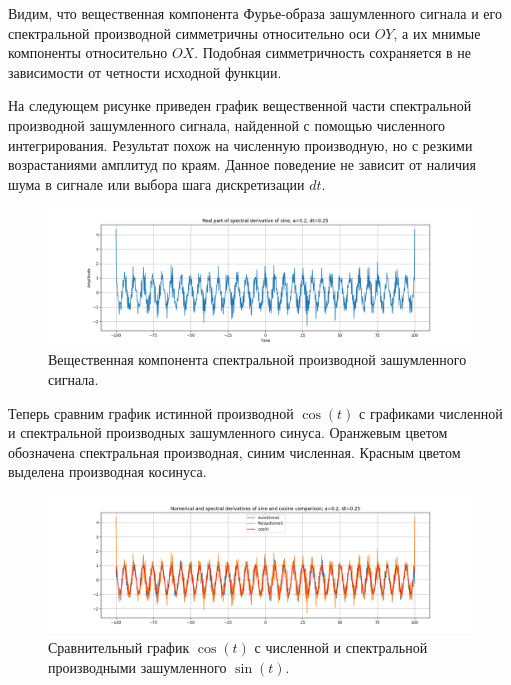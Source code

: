 \documentclass[a4paper, 12pt]{article}
\begin{document}
    Видим, что вещественная компонента Фурье-образа зашумленного сигнала и его спектральной производной симметричны относительно оси
    $OY$, а их мнимые компоненты относительно $OX$. Подобная симметричность сохраняется в не зависимости от четности исходной функции.


    На следующем рисунке приведен график вещественной части спектральной производной зашумленного сигнала, найденной с помощью численного интегрирования.
    Результат похож на численную производную, но с резкими возрастаниями амплитуд по краям. Данное поведение не зависит от наличия шума в сигнале или
    выбора шага дискретизации $dt$.
    \begin{figure}[H]
        \centering
        \includegraphics[scale=0.4]{1_re_specdiff_sine.png}
        \captionsetup{skip=0pt}
        \caption{Вещественная компонента спектральной производной зашумленного сигнала.}
        \label{fig:1respds}
    \end{figure}

    
    Теперь сравним график истинной производной $\cos{(t)}$ с графиками численной и спектральной производных зашумленного синуса.
    Оранжевым цветом обозначена спектральная производная, синим численная. Красным цветом выделена производная косинуса.
    \begin{figure}[H]
        \centering
        \includegraphics[scale=0.4]{1_css_comp.png}
        \captionsetup{skip=0pt}
        \caption{Сравнительный график $\cos{(t)}$ с численной и спектральной производными зашумленного $\sin{(t)}$.}
        \label{fig:css_comp}
    \end{figure}
\end{document}
